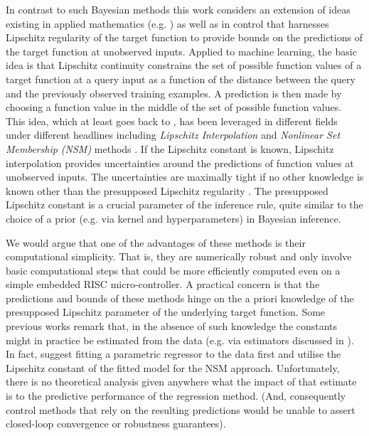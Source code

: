 \documentclass{article} %
\theoremstyle{definition}
\theoremstyle{remark}
\begin{document}

In contrast to such Bayesian methods this work considers an extension of ideas existing in applied mathematics  (e.g. \cite{Shubert:72,Zabinsky2003,Cooper1995,Cooper2006,Baran2008,Beliakov2006}) as well as in control \cite{Milanese2004,Canale2014} that harnesses Lipschitz regularity of the target function to provide bounds on the predictions of the target function at unobserved inputs. Applied to machine learning, the basic idea is that Lipschitz continuity constrains the set of possible function values of a target function at a query input as a function of the distance between the query and the previously observed training examples. A prediction is then made by choosing a function value in the middle of the set of possible function values. This idea, which at least goes back to \cite{Sukharev1978}, has been leveraged in different fields under different headlines including \emph{Lipschitz Interpolation} \cite{Zabinsky2003,Beliakov2006} and \emph{Nonlinear Set Membership (NSM)}  methods \cite{Milanese2004}. If the Lipschitz constant is known, Lipschitz interpolation provides uncertainties around the predictions of function values at unobserved inputs. The uncertainties are maximally tight if no other knowledge is known other than the presupposed Lipschitz regularity \cite{Sukharev1978,calliess2014_thesis}.
The presupposed Lipschitz constant is a crucial parameter of the inference rule, quite similar to the choice of a prior (e.g. via kernel and hyperparameters)  in Bayesian inference.

We would argue that one of the advantages of these methods is their computational simplicity. That is, they are numerically robust and only involve basic computational steps that could be more efficiently computed even on a simple embedded RISC micro-controller.
A practical concern is that the predictions and bounds of these methods hinge on the a priori knowledge of the presupposed Lipschitz parameter of the underlying target function. Some previous works remark that, in the absence of such knowledge the constants might in practice be estimated from the data (e.g. via estimators discussed in  \cite{Strongin1973,Wood1996,Beliakovsmoothing2007,Milanese2004,Beliakov2006}). In fact, \cite{Milanese2004} suggest fitting a parametric regressor to the data first and utilise the Lipschitz constant of the fitted model for the NSM approach. Unfortunately, there is no theoretical analysis given anywhere what the impact of that estimate is to the predictive performance of the regression method. (And, consequently control methods that rely on the resulting predictions would be unable to assert closed-loop convergence or robustness guarantees).
\end{document}
